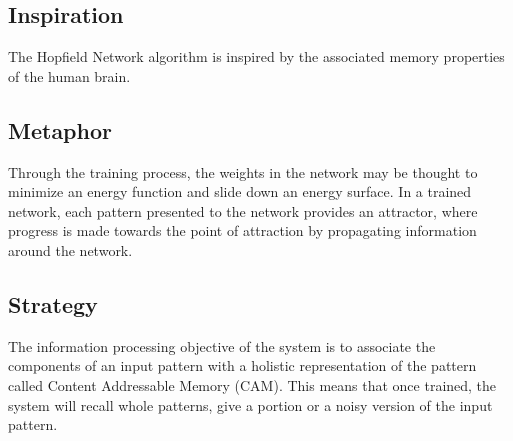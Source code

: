 \subsection{Inspiration}
The Hopfield Network algorithm is inspired by the associated memory properties of the human brain.

\subsection{Metaphor}
Through the training process, the weights in the network may be thought to minimize an energy function and slide down an energy surface. In a trained network, each pattern presented to the network provides an attractor, where progress is made towards the point of attraction by propagating information around the network.

\subsection{Strategy}
The information processing objective of the system is to associate the components of an input pattern with a holistic representation of the pattern called Content Addressable Memory (CAM). This means that once trained, the system will recall whole patterns, give a portion or a noisy version of the input pattern.

